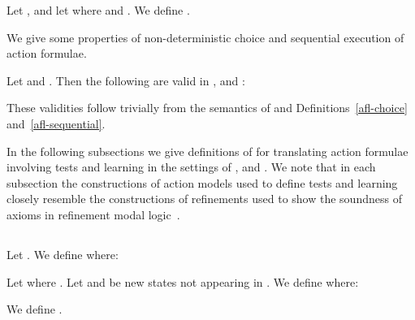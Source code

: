 \documentclass[twoside]{aiml14}
\begin{document}
  \begin{definition}\label{afl-sequential}
      Let ,
      and let  where 
       and
      .
      We define .
  \end{definition}

  We give some properties of non-deterministic choice and sequential execution
  of action formulae.

  \begin{proposition}\label{afl-choice-sequential-validities}
      Let  and . Then the following are valid in \logicAflK{}, \logicAflKFF{} and \logicAflS{}:
      
  \end{proposition}

  These validities follow trivially from the semantics of \logicAaflC{} and Definitions~\ref{afl-choice} and~\ref{afl-sequential}.

  In the following subsections we give definitions of  for
  translating action formulae involving tests and learning in the settings of
  \classK{}, \classKFF{} and \classS{}. We note that in each subsection the
  constructions of action models used to define tests and learning closely
  resemble the constructions of refinements used to show the soundness of
  axioms in refinement modal logic~\cite{bozzelli2012a,hales2012}.

  \subsection{\classK{}}

  \begin{definition}[Test]\label{afl-k-test}
      Let . 
      We define  where:
      
  \end{definition}

  \begin{definition}[Learning]\label{afl-k-learning}
      Let  where 
      .
      Let  and  be new states not appearing in .
      We define  where:
      

      We define .
  \end{definition}
\end{document}
